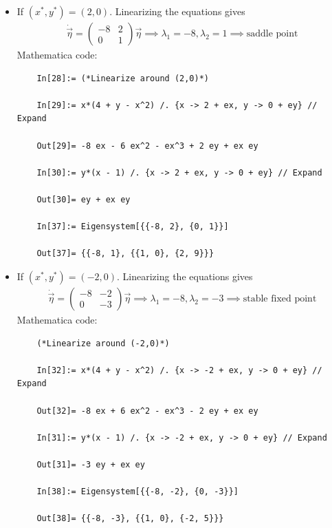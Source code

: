 \documentclass{article}
\theoremstyle{definition}
\begin{document}
\begin{itemize}
	\item If $(x^*, y^*) = (2,0)$. Linearizing the equations gives
	\begin{align*}
	\dot{\vec{\eta}} = \begin{pmatrix}
	-8 & 2 \\ 0 & 1
	\end{pmatrix} \vec{\eta} \implies \lambda_1 = -8, \lambda_2 = 1 \implies \text{saddle point}
	\end{align*}
	Mathematica code:
	\begin{lstlisting}
	In[28]:= (*Linearize around (2,0)*)
	
	In[29]:= x*(4 + y - x^2) /. {x -> 2 + ex, y -> 0 + ey} // Expand
	
	Out[29]= -8 ex - 6 ex^2 - ex^3 + 2 ey + ex ey
	
	In[30]:= y*(x - 1) /. {x -> 2 + ex, y -> 0 + ey} // Expand
	
	Out[30]= ey + ex ey
	
	In[37]:= Eigensystem[{{-8, 2}, {0, 1}}]
	
	Out[37]= {{-8, 1}, {{1, 0}, {2, 9}}}
	\end{lstlisting}
	
	
	
	
	
	
	\item If $(x^*, y^*) = (-2,0)$. Linearizing the equations gives
	\begin{align*}
	\dot{\vec{\eta}} = \begin{pmatrix}
	-8 & -2 \\ 0 & -3
	\end{pmatrix} \vec{\eta} \implies \lambda_1 = -8, \lambda_2 = -3 \implies \text{stable fixed point}
	\end{align*}
	Mathematica code:
	\begin{lstlisting}
	(*Linearize around (-2,0)*)
	
	In[32]:= x*(4 + y - x^2) /. {x -> -2 + ex, y -> 0 + ey} // Expand
	
	Out[32]= -8 ex + 6 ex^2 - ex^3 - 2 ey + ex ey
	
	In[31]:= y*(x - 1) /. {x -> -2 + ex, y -> 0 + ey} // Expand
	
	Out[31]= -3 ey + ex ey
	
	In[38]:= Eigensystem[{{-8, -2}, {0, -3}}]
	
	Out[38]= {{-8, -3}, {{1, 0}, {-2, 5}}}
	\end{lstlisting}
	

\end{itemize}
\end{document}
